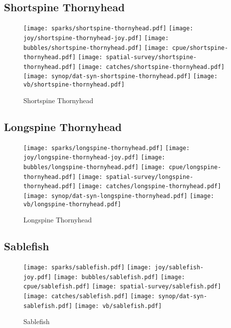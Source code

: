 \subsection*{Shortspine Thornyhead}

\begin{figure}[htbp]
\centering
\texttt{[image: sparks/shortspine-thornyhead.pdf]}
\texttt{[image: joy/shortspine-thornyhead-joy.pdf]}
\texttt{[image: bubbles/shortspine-thornyhead.pdf]}
\texttt{[image: cpue/shortspine-thornyhead.pdf]}
\texttt{[image: spatial-survey/shortspine-thornyhead.pdf]}
\texttt{[image: catches/shortspine-thornyhead.pdf]}
\texttt{[image: synop/dat-syn-shortspine-thornyhead.pdf]}
\texttt{[image: vb/shortspine-thornyhead.pdf]}
\caption{Shortspine Thornyhead}
\end{figure}
\clearpage
\subsection*{Longspine Thornyhead}

\begin{figure}[htbp]
\centering
\texttt{[image: sparks/longspine-thornyhead.pdf]}
\texttt{[image: joy/longspine-thornyhead-joy.pdf]}
\texttt{[image: bubbles/longspine-thornyhead.pdf]}
\texttt{[image: cpue/longspine-thornyhead.pdf]}
\texttt{[image: spatial-survey/longspine-thornyhead.pdf]}
\texttt{[image: catches/longspine-thornyhead.pdf]}
\texttt{[image: synop/dat-syn-longspine-thornyhead.pdf]}
\texttt{[image: vb/longspine-thornyhead.pdf]}
\caption{Longspine Thornyhead}
\end{figure}
\clearpage
\subsection*{Sablefish}

\begin{figure}[htbp]
\centering
\texttt{[image: sparks/sablefish.pdf]}
\texttt{[image: joy/sablefish-joy.pdf]}
\texttt{[image: bubbles/sablefish.pdf]}
\texttt{[image: cpue/sablefish.pdf]}
\texttt{[image: spatial-survey/sablefish.pdf]}
\texttt{[image: catches/sablefish.pdf]}
\texttt{[image: synop/dat-syn-sablefish.pdf]}
\texttt{[image: vb/sablefish.pdf]}
\caption{Sablefish}
\end{figure}
\clearpage
